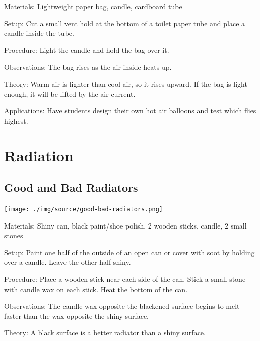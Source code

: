 \begin{multicols}{2}
\begin{description*}
\item[Materials:]{Lightweight paper bag, candle, cardboard tube}
\item[Setup:]{Cut a small vent hold at the bottom of a toilet paper tube and place a candle inside the tube.}
\item[Procedure:]{Light the candle and hold the bag over it.}
\item[Observations:]{The bag rises as the air inside heats up.}
\item[Theory:]{Warm air is lighter than cool air, so it rises upward. If the bag is light enough, it will be lifted by the air current.}
\item[Applications:]{Have students design their own hot air balloons and test which flies highest.}
\end{description*}


\section*{Radiation}


\subsection{Good and Bad Radiators}

\begin{center}
\texttt{[image: ./img/source/good-bad-radiators.png]}
\end{center}

\begin{description*}
\item[Materials:]{Shiny can, black paint/shoe polish, 2 wooden sticks, candle, 2 small stones}
\item[Setup:]{Paint one half of the outside of an open can or cover with soot by holding over a candle. Leave the other half shiny.}
\item[Procedure:]{Place a wooden stick near each side of the can. Stick a small stone with candle wax on each stick. Heat the bottom of the can.}
\item[Observations:]{The candle wax opposite the blackened surface begins to melt faster than the wax opposite the shiny surface.}
\item[Theory:]{A black surface is a better radiator than a shiny surface.}
\end{description*}


\end{multicols}
